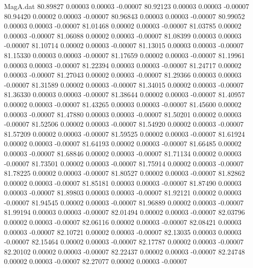 \begin{filecontents}{MagA.dat}
  80.89827    0.00003    0.00003   -0.00007
  80.92123    0.00003    0.00003   -0.00007
  80.94420    0.00002    0.00003   -0.00007
  80.96843    0.00003    0.00003   -0.00007
  80.99052    0.00003    0.00003   -0.00007
  81.01468    0.00002    0.00003   -0.00007
  81.03785    0.00002    0.00003   -0.00007
  81.06088    0.00002    0.00003   -0.00007
  81.08399    0.00003    0.00003   -0.00007
  81.10714    0.00002    0.00003   -0.00007
  81.13015    0.00003    0.00003   -0.00007
  81.15330    0.00003    0.00003   -0.00007
  81.17659    0.00002    0.00003   -0.00007
  81.19961    0.00003    0.00003   -0.00007
  81.22394    0.00003    0.00003   -0.00007
  81.24717    0.00002    0.00003   -0.00007
  81.27043    0.00002    0.00003   -0.00007
  81.29366    0.00003    0.00003   -0.00007
  81.31589    0.00002    0.00003   -0.00007
  81.34015    0.00002    0.00003   -0.00007
  81.36330    0.00003    0.00003   -0.00007
  81.38644    0.00002    0.00003   -0.00007
  81.40957    0.00002    0.00003   -0.00007
  81.43265    0.00003    0.00003   -0.00007
  81.45600    0.00002    0.00003   -0.00007
  81.47880    0.00003    0.00003   -0.00007
  81.50201    0.00002    0.00003   -0.00007
  81.52506    0.00002    0.00003   -0.00007
  81.54920    0.00002    0.00003   -0.00007
  81.57209    0.00002    0.00003   -0.00007
  81.59525    0.00002    0.00003   -0.00007
  81.61924    0.00002    0.00003   -0.00007
  81.64193    0.00002    0.00003   -0.00007
  81.66485    0.00002    0.00003   -0.00007
  81.68846    0.00002    0.00003   -0.00007
  81.71134    0.00002    0.00003   -0.00007
  81.73501    0.00002    0.00003   -0.00007
  81.75914    0.00002    0.00003   -0.00007
  81.78225    0.00002    0.00003   -0.00007
  81.80527    0.00002    0.00003   -0.00007
  81.82862    0.00002    0.00003   -0.00007
  81.85181    0.00003    0.00003   -0.00007
  81.87490    0.00003    0.00003   -0.00007
  81.89803    0.00003    0.00003   -0.00007
  81.92121    0.00002    0.00003   -0.00007
  81.94545    0.00002    0.00003   -0.00007
  81.96889    0.00002    0.00003   -0.00007
  81.99194    0.00003    0.00003   -0.00007
  82.01494    0.00002    0.00003   -0.00007
  82.03796    0.00002    0.00003   -0.00007
  82.06116    0.00002    0.00003   -0.00007
  82.08421    0.00003    0.00003   -0.00007
  82.10721    0.00002    0.00003   -0.00007
  82.13035    0.00003    0.00003   -0.00007
  82.15464    0.00002    0.00003   -0.00007
  82.17787    0.00002    0.00003   -0.00007
  82.20102    0.00002    0.00003   -0.00007
  82.22437    0.00002    0.00003   -0.00007
  82.24748    0.00002    0.00003   -0.00007
  82.27077    0.00002    0.00003   -0.00007

\end{filecontents}
